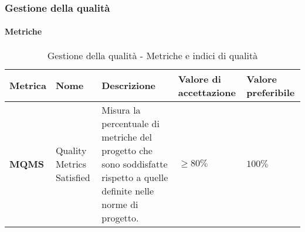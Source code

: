 \subsubsection{Gestione della qualità}
\paragraph*{Metriche}
\hspace{1pt}
\begin{table}[H]
    \centering
    \begin{tabular}{|C{1.5cm}|L{3cm}|L{4cm}|L{2.5cm}|L{2.5cm}|}
        \hline
        \textbf{Metrica} & \textbf{Nome} & \textbf{Descrizione} & \textbf{Valore di accettazione} & \textbf{Valore preferibile} \\
        \hline
        \textbf{MQMS} & Quality Metrics Satisfied & Misura la percentuale di metriche del progetto che sono soddisfatte rispetto a quelle definite nelle norme di progetto. & $\geq 80\%$ & $ 100\% $ \\
        \hline
    \end{tabular}
    \caption{Gestione della qualità - Metriche e indici di qualità}
    \label{tab:gestione_metriche_testo}
\end{table}


